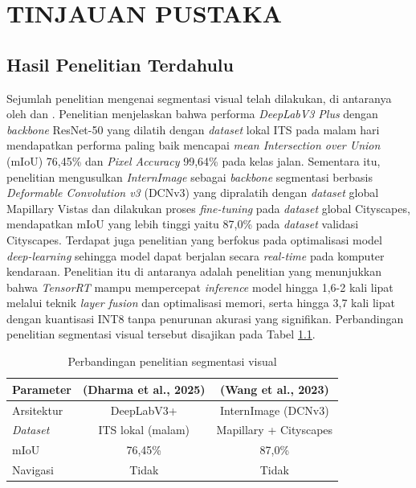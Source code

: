 \chapter{TINJAUAN PUSTAKA}
\label{chap:tinjauanpustaka}

\section{Hasil Penelitian Terdahulu}
\label{sec:hasilpenelitianterdahulu}

Sejumlah penelitian mengenai segmentasi visual telah dilakukan, di antaranya oleh \textcite{Dharma2025PerformanceEvaluation} dan \textcite{wang2023internimage}.
Penelitian \textcite{Dharma2025PerformanceEvaluation} menjelaskan bahwa performa \emph{DeepLabV3 Plus} dengan \emph{backbone} ResNet-50 yang dilatih dengan \emph{dataset} lokal ITS pada malam hari mendapatkan performa paling baik mencapai \emph{mean Intersection over Union} (mIoU) 76,45\% dan \emph{Pixel Accuracy} 99,64\% pada kelas jalan.
Sementara itu, penelitian \textcite{wang2023internimage} mengusulkan \emph{InternImage} sebagai \emph{backbone} segmentasi berbasis \emph{Deformable Convolution v3} (DCNv3) yang dipralatih dengan \emph{dataset} global Mapillary Vistas dan dilakukan proses \emph{fine-tuning} pada \emph{dataset} global Cityscapes, mendapatkan mIoU yang lebih tinggi yaitu 87,0\% pada \emph{dataset} validasi Cityscapes.
Terdapat juga penelitian yang berfokus pada optimalisasi model \emph{deep-learning} sehingga model dapat berjalan secara \emph{real-time} pada komputer kendaraan.
Penelitian itu di antaranya adalah penelitian \textcite{zhou2022exploring} yang menunjukkan bahwa \emph{TensorRT} mampu mempercepat \emph{inference} model hingga 1,6-2 kali lipat melalui teknik \emph{layer fusion} dan optimalisasi memori, serta hingga 3,7 kali lipat dengan kuantisasi INT8 tanpa penurunan akurasi yang signifikan.
Perbandingan penelitian segmentasi visual tersebut disajikan pada Tabel \ref{tab:perbandingan_terdahulu}.

\begin{table}[H]
  \centering
  \caption{Perbandingan penelitian segmentasi visual}
  \label{tab:perbandingan_terdahulu}
  \renewcommand{\arraystretch}{1.4}
  \begin{tabular}{p{2.5cm}cc}
    \hline
    \textbf{Parameter} & \textbf{(Dharma et al., 2025)} & \textbf{(Wang et al., 2023)} \\
    \hline
    Arsitektur & DeepLabV3+ & InternImage (DCNv3) \\
    \emph{Dataset} & ITS lokal (malam) & Mapillary + Cityscapes \\
    mIoU & 76,45\% & 87,0\% \\
    Navigasi & Tidak & Tidak \\
    \hline
  \end{tabular}
\end{table}

